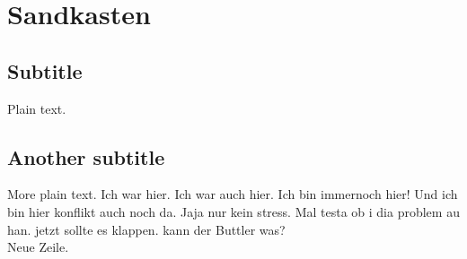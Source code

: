 \documentclass{article}
\begin{document}
\section{Sandkasten}

\subsection{Subtitle}

Plain text.
\subsection{Another subtitle}

More plain text.
Ich war hier.
Ich war auch hier.
Ich bin immernoch hier!
Und ich bin hier konflikt auch noch da.
Jaja nur kein stress.
Mal testa ob i dia problem au han.
jetzt sollte es klappen.
kann der Buttler was?
\\Neue Zeile.
\end{document}
